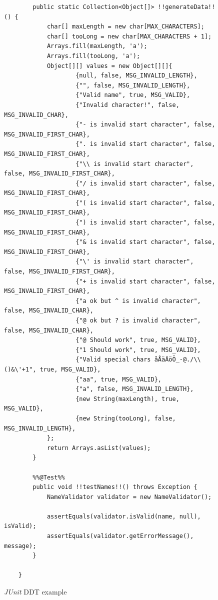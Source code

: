 \begin{figure}[H]
\begin{lstlisting}[style=javatiny]
        %%@Parameters%%(name = "{index}: name: \"{0}\"")
        public static Collection<Object[]> !!generateData!!() {
            char[] maxLength = new char[MAX_CHARACTERS];
            char[] tooLong = new char[MAX_CHARACTERS + 1];
            Arrays.fill(maxLength, 'a');
            Arrays.fill(tooLong, 'a');
            Object[][] values = new Object[][]{
                    {null, false, MSG_INVALID_LENGTH},
                    {"", false, MSG_INVALID_LENGTH},
                    {"Valid name", true, MSG_VALID},
                    {"Invalid character!", false, MSG_INVALID_CHAR},
                    {"- is invalid start character", false, MSG_INVALID_FIRST_CHAR},
                    {". is invalid start character", false, MSG_INVALID_FIRST_CHAR},
                    {"\\ is invalid start character", false, MSG_INVALID_FIRST_CHAR},
                    {"/ is invalid start character", false, MSG_INVALID_FIRST_CHAR},
                    {"( is invalid start character", false, MSG_INVALID_FIRST_CHAR},
                    {") is invalid start character", false, MSG_INVALID_FIRST_CHAR},
                    {"& is invalid start character", false, MSG_INVALID_FIRST_CHAR},
                    {"\' is invalid start character", false, MSG_INVALID_FIRST_CHAR},
                    {"+ is invalid start character", false, MSG_INVALID_FIRST_CHAR},
                    {"a ok but ^ is invalid character", false, MSG_INVALID_CHAR},
                    {"@ ok but ? is invalid character", false, MSG_INVALID_CHAR},
                    {"@ Should work", true, MSG_VALID},
                    {"1 Should work", true, MSG_VALID},
                    {"Valid special chars åÅäÄöÖ_-@./\\()&\'+1", true, MSG_VALID},
                    {"aa", true, MSG_VALID},
                    {"a", false, MSG_INVALID_LENGTH},
                    {new String(maxLength), true, MSG_VALID},
                    {new String(tooLong), false, MSG_INVALID_LENGTH},
            };
            return Arrays.asList(values);
        }

        %%@Test%%
        public void !!testNames!!() throws Exception {
            NameValidator validator = new NameValidator();

            assertEquals(validator.isValid(name, null), isValid);
            assertEquals(validator.getErrorMessage(), message);
        }

    }
        \end{lstlisting}
        \caption{\textit{JUnit} DDT example}
        \label{fig:junit-bit-example}
    \end{figure}

